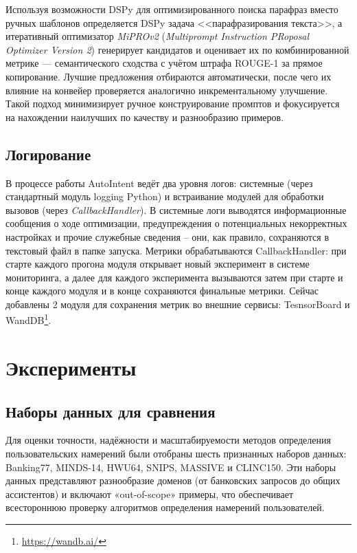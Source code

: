 \documentclass[14pt,a4paper,oneside,openany]{extbook}
\begin{document}
Используя возможности DSPy для оптимизированного поиска парафраз вместо ручных шаблонов определяется DSPy задача {}<<парафразирования текста>>{}, а итеративный оптимизатор \emph{MiPROv2}\autocite{opsahl-ong_optimizing_2024} (\emph{Multiprompt Instruction PRoposal Optimizer Version 2}) генерирует кандидатов и оценивает их по комбинированной метрике — семантического сходства с учётом штрафа ROUGE-1\autocite{lin_rouge_} за прямое копирование. Лучшие предложения отбираются автоматически, после чего их влияние на конвейер проверяется аналогично инкрементальному улучшение. Такой подход минимизирует ручное конструирование промптов и фокусируется на нахождении наилучших по качеству и разнообразию примеров.
\section{Логирование}
\label{sec:orgd1f8846}
В процессе работы AutoIntent ведёт два уровня логов: системные (через стандартный модуль logging Python) и встраивание модулей для обработки вызовов (через \emph{CallbackHandler}). В системные логи выводятся информационные сообщения о ходе оптимизации, предупреждения о потенциальных некорректных настройках и прочие служебные сведения – они, как правило, сохраняются в текстовый файл в папке запуска. Метрики обрабатываются CallbackHandler: при старте каждого прогона модуля открывает новый эксперимент в системе мониторинга, а далее для каждого эксперимента вызываются затем при старте и конце каждого модуля и в конце сохраняются финальные метрики. Сейчас добавлены 2 модуля для сохранения метрик во внешние сервисы: TesnsorBoard и WandDB\footnote{\url{https://wandb.ai/}}.
\chapter{Эксперименты}
\label{sec:org349a146}
\section{Наборы данных для сравнения}
\label{sec:orgc532320}
Для оценки точности, надёжности и масштабируемости методов определения пользовательских намерений были отобраны шесть признанных наборов данных: Banking77\autocite{casanueva_efficient_2020}, MINDS-14\autocite{gerz_multilingual_2021}, HWU64\autocite{liu_benchmarking_2019}, SNIPS\autocite{coucke_snips_2018}, MASSIVE\autocite{fitzgerald_massive_2022} и CLINC150\autocite{unknown_clinc150_2020}. Эти наборы данных представляют разнообразие доменов (от банковских запросов до общих ассистентов) и включают «out-of-scope» примеры, что обеспечивает всестороннюю проверку алгоритмов определения намерений пользователей.
\end{document}
